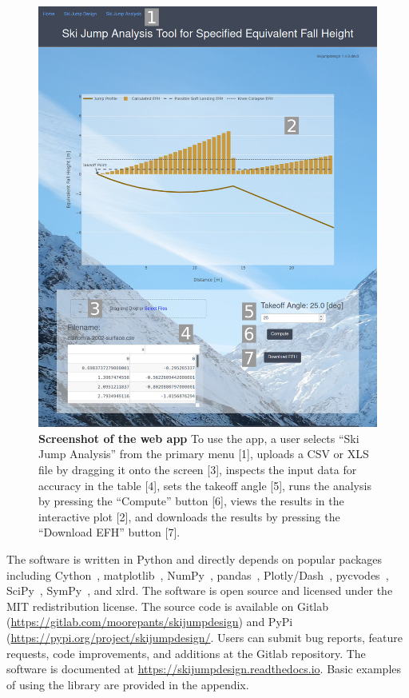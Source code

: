 \documentclass{article}
\begin{document}
\begin{figure}
  \centering
  \includegraphics[width=5.00in]{figures/web-app-screenshot.png}
  \caption{\textbf{Screenshot of the web app} To use the app, a user selects
    ``Ski Jump Analysis'' from the primary menu [1], uploads a CSV or XLS file
    by dragging it onto the screen [3], inspects the input data for accuracy in
    the table [4], sets the takeoff angle [5], runs the analysis by pressing
    the ``Compute'' button [6], views the results in the interactive plot [2],
    and downloads the results by pressing the ``Download EFH'' button [7].}
  \label{fig:web-app-screenshot}
\end{figure}

The software is written in Python and directly depends on popular packages
including Cython~\cite{Behnel2011}, matplotlib~\cite{Hunter2007},
NumPy~\cite{Oliphant2006}, pandas~\cite{McKinney2020},
Plotly/Dash~\cite{Plotly2015}, pycvodes~\cite{Dahlgren2018},
SciPy~\cite{Virtanen2020}, SymPy~\cite{Meurer2017}, and xlrd.  The software is
open source and licensed under the MIT redistribution license.  The source code
is available on Gitlab (\url{https://gitlab.com/moorepants/skijumpdesign}) and
PyPi (\url{https://pypi.org/project/skijumpdesign/}. Users can submit bug
reports, feature requests, code improvements, and additions at the Gitlab
repository. The software is documented at
\url{https://skijumpdesign.readthedocs.io}. Basic examples of using the library
are provided in the appendix.
\end{document}
